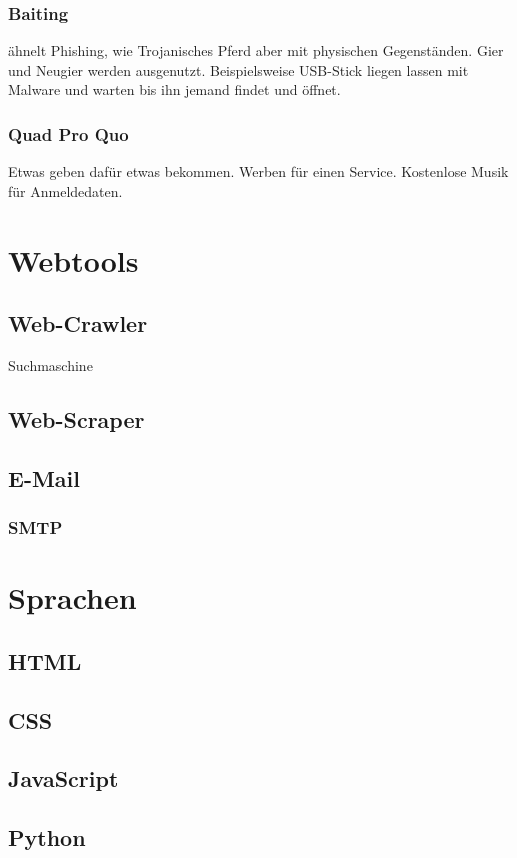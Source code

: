 \subsubsection{Baiting}
ähnelt Phishing, wie Trojanisches Pferd aber mit physischen Gegenständen. Gier und Neugier werden ausgenutzt. Beispielsweise USB-Stick liegen lassen mit Malware und warten bis ihn jemand findet und öffnet.

\subsubsection{Quad Pro Quo}
Etwas geben dafür etwas bekommen. Werben für einen Service. Kostenlose Musik für Anmeldedaten.

\section{Webtools}

\subsection{Web-Crawler}
Suchmaschine

\subsection{Web-Scraper}

\subsection{E-Mail}
\subsubsection{SMTP}

\section{Sprachen}
\subsection{HTML}
\subsection{CSS}
\subsection{JavaScript}
\subsection{Python}
